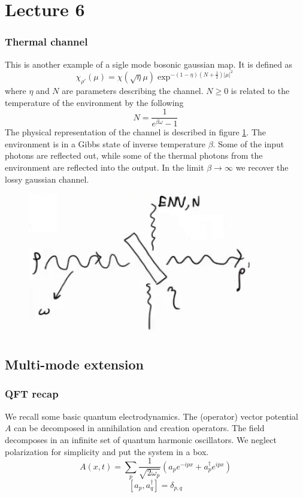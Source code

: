\documentclass[a4paper, 11pt]{article}
\begin{document}
	\section{Lecture 6}
	\subsubsection{Thermal channel}
	This is another example of a sigle mode bosonic gaussian map. It is defined as
	\[ \chi_{\rho'}(\mu) = \chi(\sqrt{\eta}\mu) \exp^{-(1-\eta)(N+\frac{1}{2}) |\mu|^2} \]
	where $\eta$ and $N$ are parameters describing the channel. $N\ge 0$ is related to the temperature of the environment by the following
	\[ N = \dfrac{1}{e^{\beta\omega} -1} \]
	The physical representation of the channel is described in figure \ref{fig:thermal}. The environment is in a Gibbs state of inverse temperature $\beta$. Some of the input photons are reflected out, while some of the thermal photons from the environment are reflected into the output. In the limit $\beta\rightarrow \infty$ we recover the lossy gaussian channel.
	
	\begin{figure}
		\centering
		\includegraphics[width=0.7\linewidth]{thermal}
		\caption{}
		\label{fig:thermal}
	\end{figure}
	
	\subsection{Multi-mode extension}
	\subsubsection{QFT recap}
	We recall some basic quantum electrodynamics. The (operator) vector potential $A$ can be decomposed in annihilation and creation operators. The field decomposes in an infinite set of quantum harmonic oscillators. We neglect polarization for simplicity and put the system in a box.
	\[ A(x,t) = \sum_p \dfrac{1}{\sqrt{2\omega_p}} (a_p e^{-ipx} + a_p^\dagger e^{ipx}) \]
	\[ [a_p, a_q^\dagger] = \delta_{p,q} \]
	
\end{document}
